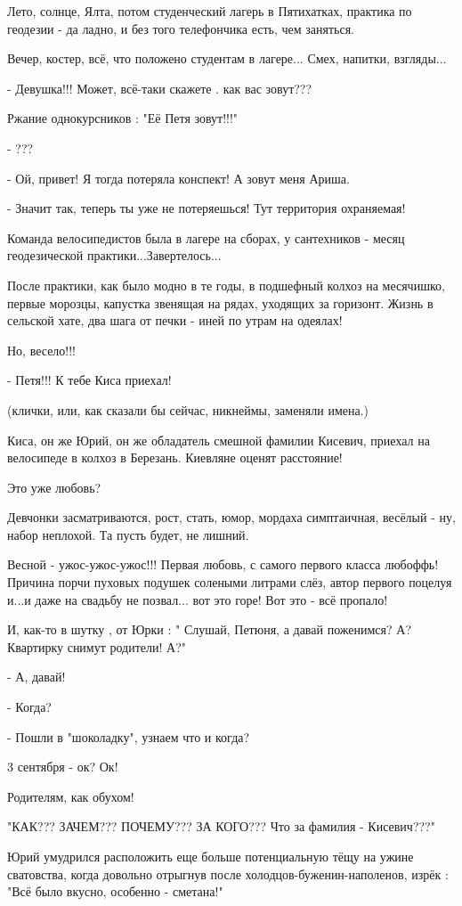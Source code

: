 Лето, солнце, Ялта, потом студенческий лагерь в Пятихатках, практика по
геодезии - да ладно, и без того телефончика есть, чем заняться.

Вечер, костер, всё, что положено студентам в лагере... Смех, напитки,
взгляды...

- Девушка!!! Может, всё-таки скажете . как вас зовут???

Ржание однокурсников : "Её Петя зовут!!!"

- ???

- Ой, привет! Я тогда потеряла конспект! А зовут меня Ариша.

- Значит так, теперь ты уже не потеряешься! Тут территория охраняемая!

Команда велосипедистов была в лагере на сборах, у сантехников - месяц
геодезической практики...Завертелось...

После практики, как было модно в те годы, в подшефный колхоз на месячишко,
первые морозцы, капустка звенящая на рядах, уходящих за горизонт. Жизнь в
сельской хате, два шага от печки - иней по утрам на одеялах!

Но, весело!!!

- Петя!!! К тебе Киса приехал!

(клички, или, как сказали бы сейчас, никнеймы, заменяли имена.)

Киса, он же Юрий, он же обладатель смешной фамилии Кисевич, приехал на
велосипеде в колхоз в Березань. Киевляне оценят расстояние!

Это уже любовь?

Девчонки засматриваются, рост, стать, юмор, мордаха симптаичная, весёлый - ну,
набор неплохой. Та пусть будет, не лишний.

Весной - ужос-ужос-ужос!!! Первая любовь, с самого первого класса любоффь!
Причина порчи пуховых подушек солеными литрами слёз, автор первого поцелуя
и...и даже на свадьбу не позвал... вот это горе! Вот это - всё пропало!

И, как-то в шутку , от Юрки : " Слушай, Петюня, а давай поженимся? А? Квартирку
снимут родители! А?"

- А, давай!

- Когда?

- Пошли в "шоколадку", узнаем что и когда?

3 сентября - ок? Ок!

Родителям, как обухом!

"КАК??? ЗАЧЕМ??? ПОЧЕМУ??? ЗА КОГО??? Что за фамилия - Кисевич???"

Юрий умудрился расположить еще больше потенциальную тёщу на ужине сватовства,
когда довольно отрыгнув после холодцов-буженин-наполенов, изрёк : "Всё было
вкусно, особенно - сметана!"

